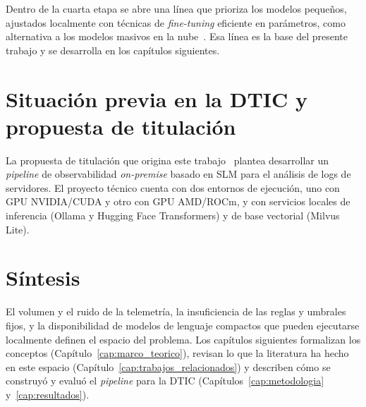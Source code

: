 
Dentro de la cuarta etapa se abre una línea que prioriza los modelos pequeños, ajustados localmente con técnicas de \textit{fine-tuning} eficiente en parámetros, como alternativa a los modelos masivos en la nube~\cite{wang2025_slm_survey, lim2025_logadreft, liu2025_lineadapter, saha2025_slm_minimal}. Esa línea es la base del presente trabajo y se desarrolla en los capítulos siguientes.

\section{Situación previa en la DTIC y propuesta de titulación}\label{sec:ant_dtic}

La propuesta de titulación que origina este trabajo~\cite{orellana2026_propuesta} plantea desarrollar un \textit{pipeline} de observabilidad \textit{on-premise} basado en SLM para el análisis de logs de servidores. %
El proyecto técnico cuenta con dos entornos de ejecución, uno con GPU NVIDIA/CUDA y otro con GPU AMD/ROCm, y con servicios locales de inferencia (Ollama y Hugging Face Transformers) y de base vectorial (Milvus Lite).

\section{Síntesis}\label{sec:ant_sintesis}

El volumen y el ruido de la telemetría, la insuficiencia de las reglas y umbrales fijos, y la disponibilidad de modelos de lenguaje compactos que pueden ejecutarse localmente definen el espacio del problema. Los capítulos siguientes formalizan los conceptos (Capítulo~\ref{cap:marco_teorico}), revisan lo que la literatura ha hecho en este espacio (Capítulo~\ref{cap:trabajos_relacionados}) y describen cómo se construyó y evaluó el \textit{pipeline} para la DTIC (Capítulos~\ref{cap:metodologia} y~\ref{cap:resultados}).
